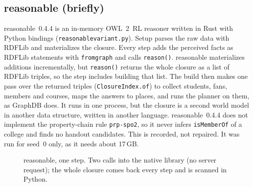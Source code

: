 \documentclass[10pt]{article}
\newcommand{\brkunderscore}{\textunderscore\allowbreak}
\newcommand{\code}[1]{{\let\_\brkunderscore\texttt{#1}}}
\newcommand{\file}[1]{{\let\_\brkunderscore\texttt{#1}}}
\def\cA{1.55}\def\cB{4.05}\def\cC{6.55}\def\cD{9.05}\def\cE{11.55}\def\cF{14.05}
\def\yP{0.85}\def\yX{-1.5}
\newcommand{\headers}[6]{%
  \node[head] at (\cA,2.45) {#1}; \node[head] at (\cB,2.45) {#2}; \node[head] at (\cC,2.45) {#3};
  \node[head] at (\cD,2.45) {#4}; \node[head] at (\cE,2.45) {#5}; \node[head] at (\cF,2.45) {#6};}
\newcommand{\pylane}[1]{%
  \draw[lane=pyline, fill=pyfill] (0,0) rectangle (15.4,2.15);
  \node[lanelabel, text=pyline] at (0,2.15) {#1};}
\newcommand{\exlane}[2][solid]{%
  \draw[lane=exline, fill=exfill, #1] (0,-2.8) rectangle (15.4,-0.55);
  \node[lanelabel, text=exline, anchor=south west] at (0,-2.8) {#2};}
\newcommand{\tagS}[1]{\node[badge=tagS, anchor=south east] at ([xshift=-1pt,yshift=1pt]#1.north east) {S};}
\newcommand{\tagMP}[1]{\node[badge=tagP, anchor=south east] at ([xshift=-1pt,yshift=1pt]#1.north east) {P};
  \node[badge=tagM, anchor=south east] at ([xshift=-10pt,yshift=1pt]#1.north east) {M};}
\begin{document}
\subsection{reasonable (briefly)}
\label{sec:reasonable}

reasonable~0.4.4 is an in-memory OWL~2~RL reasoner written in Rust with Python bindings (\file{reasonable\_variant.py}).
Setup parses the raw data with RDFLib and materializes the closure. Every step adds the perceived facts as RDFLib
statements with \code{from\_graph} and calls \code{reason()}. reasonable materializes additions incrementally, but
\code{reason()} returns the whole closure as a list of RDFLib triples, so the step includes building that list. The
build then makes one pass over the returned triples (\code{ClosureIndex.of}) to collect students, fans, members and
courses, maps the answers to places, and runs the planner on them, as GraphDB does. It runs in one process, but the
closure is a second world model in another data structure, written in another language. reasonable~0.4.4 does not
implement the property-chain rule \code{prp-spo2}, so it never infers \code{isMemberOf} of a college and finds no
handout candidates. This is recorded, not repaired. It was run for seed~0 only, as it needs about 17\,GB.

\begin{figure}[t]
\centering
{}
\caption{reasonable, one step. Two calls into the native library (no server request); the whole closure comes back
every step and is scanned in Python.}
\label{fig:reasonable}
\end{figure}
\end{document}
